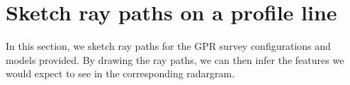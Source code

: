 \documentclass[twosides]{EOSC350Lab} %
\begin{document}


\section*{Sketch ray paths on a profile line}











In this section, we sketch ray paths for the GPR survey configurations and models provided. By drawing the ray paths, we can then infer the features we would expect to see in the corresponding radargram.

\end{document}
